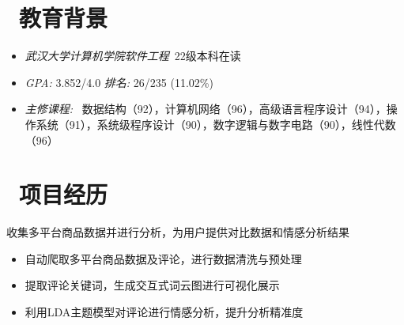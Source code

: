 \documentclass{../../styles/resume}
\begin{document}

\begin{center}
  \begin{minipage}{\textwidth}
    \centering
    \vspace{0.1em}
  \end{minipage}
\end{center}



\section{\faGraduationCap\ 教育背景}
\begin{itemize}
  \item \textit{武汉大学计算机学院软件工程}\ 22级本科在读
  \item \textit{GPA:} 3.852/4.0 \quad\quad \textit{排名:} 26/235 (11.02\%)
    \item\textit{主修课程: }\ 数据结构（92），计算机网络（96），⾼级语⾔程序设计（94），操作系统（91），系统级程序设计（90），数字逻辑与数字电路（90），线性代数（96）
\end{itemize}

\section{\faUsers\ 项目经历}

\begin{onehalfspacing}
收集多平台商品数据并进行分析，为用户提供对比数据和情感分析结果
\begin{itemize}
  \item 自动爬取多平台商品数据及评论，进行数据清洗与预处理
  \item 提取评论关键词，生成交互式词云图进行可视化展示
  \item 利用LDA主题模型对评论进行情感分析，提升分析精准度
\end{itemize}
\end{onehalfspacing}
\end{document}
